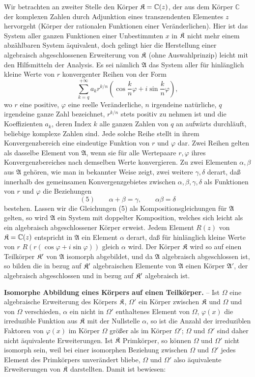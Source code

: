 Wir betrachten an zweiter Stelle den Körper \(\mathfrak K=\mathbb C(z)\), der aus dem Körper \(\mathbb C\) der komplexen Zahlen durch Adjunktion eines transzendenten Elementes \(z\) hervorgeht (Körper der rationalen Funktionen einer Veränderlichen). Hier ist das System aller ganzen Funktionen einer Unbestimmten \(x\) in \(\mathfrak K\) nicht mehr einem abzählbaren System äquivalent, doch gelingt hier die Herstellung einer algebraisch abgeschlossenen Erweiterung von \(\mathfrak K\) (ohne Auswahlprinzip) leicht mit den Hilfsmitteln der Analysis. Es sei nämlich \(\mathfrak A\) das System aller für hinlänglich kleine Werte von \(r\) konvergenter Reihen von der Form
\[
\sum_{k=q}^{+\infty} a_k r^{k/n}\left(\cos\frac{k}{n}\varphi+i\sin\frac{k}{n}\varphi\right),
\]
wo \(r\) eine positive, \(\varphi\) eine reelle Veränderliche, \(n\) irgendeine natürliche, \(q\) irgendeine ganze Zahl bezeichnet, \(r^{k/n}\) stets positiv zu nehmen ist und die Koeffizienten \(a_k\), deren Index \(k\) alle ganzen Zahlen von \(q\) an aufwärts durchläuft, beliebige komplexe Zahlen sind. Jede solche Reihe stellt in ihrem Konvergenzbereich eine eindeutige Funktion von \(r\) und \(\varphi\) dar. Zwei Reihen gelten als dasselbe Element von \(\mathfrak A\), wenn sie für alle Wertepaare \(r,\varphi\) ihres Konvergenzbereiches nach demselben Werte konvergieren. Zu zwei Elementen \(\alpha,\beta\) aus \(\mathfrak A\) gehören, wie man in bekannter Weise zeigt, zwei weitere \(\gamma,\delta\) derart, daß innerhalb des gemeinsamen Konvergenzgebietes zwischen \(\alpha,\beta,\gamma,\delta\) als Funktionen von \(r\) und \(\varphi\) die Beziehungen
\[
(5)\qquad \alpha+\beta=\gamma,\qquad \alpha\beta=\delta
\]
bestehen. Lassen wir die Gleichungen (5) als Kompositionsgleichungen für \(\mathfrak A\) gelten, so wird \(\mathfrak A\) ein System mit doppelter Komposition, welches sich leicht als ein algebraisch abgeschlossener Körper erweist. Jedem Element \(R(z)\) von \(\mathfrak K=\mathbb C(z)\) entspricht in \(\mathfrak A\) ein Element \(\alpha\) derart, daß für hinlänglich kleine Werte von \(r\) \(R(r(\cos\varphi+i\sin\varphi))\) gleich \(\alpha\) wird. Der Körper \(\mathfrak K\) wird so auf einen Teilkörper \(\mathfrak K'\) von \(\mathfrak A\) isomorph abgebildet, und da \(\mathfrak A\) algebraisch abgeschlossen ist, so bilden die in bezug auf \(\mathfrak K'\) algebraischen Elemente von \(\mathfrak A\) einen Körper \(\mathfrak A'\), der algebraisch abgeschlossen und in bezug auf \(\mathfrak K'\) algebraisch ist.

\textbf{Isomorphe Abbildung eines Körpers auf einen Teilkörper.} -- Ist \(\Omega\) eine algebraische Erweiterung des Körpers \(\mathfrak K\), \(\Omega'\) ein Körper zwischen \(\mathfrak K\) und \(\Omega\) und von \(\Omega\) verschieden, \(\alpha\) ein nicht in \(\Omega'\) enthaltenes Element von \(\Omega\), \(\varphi(x)\) die irreduzible Funktion aus \(\mathfrak K\) mit der Nullstelle \(\alpha\), so ist die Anzahl der irreduziblen Faktoren von \(\varphi(x)\) im Körper \(\Omega\) größer als im Körper \(\Omega'\); \(\Omega\) und \(\Omega'\) sind daher nicht äquivalente Erweiterungen. Ist \(\mathfrak K\) Primkörper, so können \(\Omega\) und \(\Omega'\) nicht isomorph sein, weil bei einer isomorphen Beziehung zwischen \(\Omega\) und \(\Omega'\) jedes Element des Primkörpers unverändert bliebe, \(\Omega\) und \(\Omega'\) also äquivalente Erweiterungen von \(\mathfrak K\) darstellten. Damit ist bewiesen:

